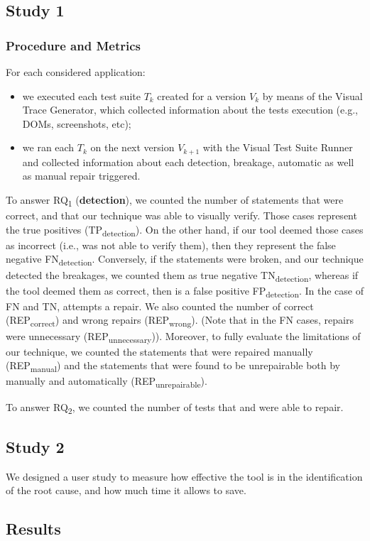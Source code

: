 \subsection{Study 1}

\subsubsection{Procedure and Metrics}\label{sec:procedure}

For each considered application: 

\begin{itemize}
\item we executed each test suite $T_k$ created for a version $V_k$ by means of the Visual Trace Generator, which collected information about the tests execution (e.g., DOMs, screenshots, etc);
\item we ran each $T_k$ on the next version $V_{k+1}$ with the Visual Test Suite Runner and collected information about each detection, breakage, automatic as well as manual repair triggered.
\end{itemize}

\noindent
To answer RQ\textsubscript{1} (\textbf{detection}), we counted the number of statements that were correct, and that our technique was able to visually verify. Those cases represent the true positives (TP\textsubscript{detection}). On the other hand, if our tool deemed those cases as incorrect (i.e., was not able to verify them), then they represent the false negative FN\textsubscript{detection}. Conversely, if the statements were broken, and our technique detected the breakages, we counted them as true negative TN\textsubscript{detection}, whereas if the tool deemed them as correct, then is a false positive FP\textsubscript{detection}.
%
In the case of FN and TN, \tool attempts a repair. We also counted the number of correct (REP\textsubscript{correct}) and wrong repairs (REP\textsubscript{wrong}). (Note that in the FN cases, repairs were unnecessary (REP\textsubscript{unnecessary})). Moreover, to fully evaluate the limitations of our technique, we counted the statements that were repaired manually (REP\textsubscript{manual}) and the statements that were found to be unrepairable both by manually and automatically (REP\textsubscript{unrepairable}).

\noindent
To answer RQ\textsubscript{2}, we counted the number of tests that \tool and \water were able to repair.

\subsection{Study 2}

We designed a user study to measure how effective the tool is in the identification of the root cause, and how much time it allows to save.

\subsection{Results}\label{sec:results}











